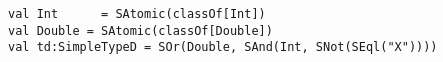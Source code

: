 \begin{lstlisting}[style=reclojureScala]
val Int      = SAtomic(classOf[Int])
val Double = SAtomic(classOf[Double])
val td:SimpleTypeD = SOr(Double, SAnd(Int, SNot(SEql("X"))))
\end{lstlisting}
